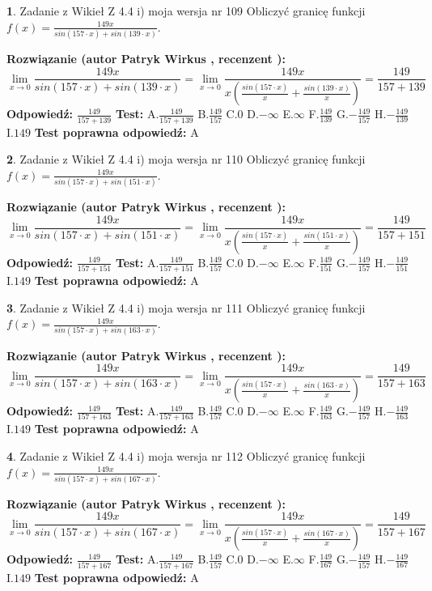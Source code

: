 \documentclass[12pt, a4paper]{article}
\theoremstyle{definition} %
\newtheorem{zad}{}
\newcommand{\zadStart}[1]{\begin{zad}#1\newline}
\newcommand{\zadStop}{\end{zad}}
\newcommand{\rozwStart}[2]{\noindent \textbf{Rozwiązanie (autor #1 , recenzent #2): }\newline}
\newcommand{\rozwStop}{\newline}
\newcommand{\odpStart}{\noindent \textbf{Odpowiedź:}\newline}
\newcommand{\odpStop}{\newline}
\newcommand{\testStart}{\noindent \textbf{Test:}\newline}
\newcommand{\testStop}{\newline}
\newcommand{\kluczStart}{\noindent \textbf{Test poprawna odpowiedź:}\newline}
\newcommand{\kluczStop}{\newline}
\begin{document}
\zadStart{Zadanie z Wikieł Z 4.4 i) moja wersja nr 109}
Obliczyć granicę funkcji $f(x)=\frac{149x}{sin(157\cdot x) +sin(139\cdot x)}$.
\zadStop
\rozwStart{Patryk Wirkus}{}
$$\lim\limits_{x\to 0}\frac{149x}{sin(157\cdot x) +sin(139\cdot x)}=\lim\limits_{x\to 0}\frac{149x}{x(\frac{sin(157\cdot x)}{x}+\frac{sin(139\cdot x)}{x})}=\frac{149}{157+139}$$
\rozwStop
\odpStart
$\frac{149}{157+139}$
\odpStop
\testStart
A.$\frac{149}{157+139}$
B.$\frac{149}{157}$
C.$0$
D.$-\infty$
E.$\infty$
F.$\frac{149}{139}$
G.$-\frac{149}{157}$
H.$-\frac{149}{139}$
I.$149$
\testStop
\kluczStart
A
\kluczStop



\zadStart{Zadanie z Wikieł Z 4.4 i) moja wersja nr 110}
Obliczyć granicę funkcji $f(x)=\frac{149x}{sin(157\cdot x) +sin(151\cdot x)}$.
\zadStop
\rozwStart{Patryk Wirkus}{}
$$\lim\limits_{x\to 0}\frac{149x}{sin(157\cdot x) +sin(151\cdot x)}=\lim\limits_{x\to 0}\frac{149x}{x(\frac{sin(157\cdot x)}{x}+\frac{sin(151\cdot x)}{x})}=\frac{149}{157+151}$$
\rozwStop
\odpStart
$\frac{149}{157+151}$
\odpStop
\testStart
A.$\frac{149}{157+151}$
B.$\frac{149}{157}$
C.$0$
D.$-\infty$
E.$\infty$
F.$\frac{149}{151}$
G.$-\frac{149}{157}$
H.$-\frac{149}{151}$
I.$149$
\testStop
\kluczStart
A
\kluczStop



\zadStart{Zadanie z Wikieł Z 4.4 i) moja wersja nr 111}
Obliczyć granicę funkcji $f(x)=\frac{149x}{sin(157\cdot x) +sin(163\cdot x)}$.
\zadStop
\rozwStart{Patryk Wirkus}{}
$$\lim\limits_{x\to 0}\frac{149x}{sin(157\cdot x) +sin(163\cdot x)}=\lim\limits_{x\to 0}\frac{149x}{x(\frac{sin(157\cdot x)}{x}+\frac{sin(163\cdot x)}{x})}=\frac{149}{157+163}$$
\rozwStop
\odpStart
$\frac{149}{157+163}$
\odpStop
\testStart
A.$\frac{149}{157+163}$
B.$\frac{149}{157}$
C.$0$
D.$-\infty$
E.$\infty$
F.$\frac{149}{163}$
G.$-\frac{149}{157}$
H.$-\frac{149}{163}$
I.$149$
\testStop
\kluczStart
A
\kluczStop



\zadStart{Zadanie z Wikieł Z 4.4 i) moja wersja nr 112}
Obliczyć granicę funkcji $f(x)=\frac{149x}{sin(157\cdot x) +sin(167\cdot x)}$.
\zadStop
\rozwStart{Patryk Wirkus}{}
$$\lim\limits_{x\to 0}\frac{149x}{sin(157\cdot x) +sin(167\cdot x)}=\lim\limits_{x\to 0}\frac{149x}{x(\frac{sin(157\cdot x)}{x}+\frac{sin(167\cdot x)}{x})}=\frac{149}{157+167}$$
\rozwStop
\odpStart
$\frac{149}{157+167}$
\odpStop
\testStart
A.$\frac{149}{157+167}$
B.$\frac{149}{157}$
C.$0$
D.$-\infty$
E.$\infty$
F.$\frac{149}{167}$
G.$-\frac{149}{157}$
H.$-\frac{149}{167}$
I.$149$
\testStop
\kluczStart
A
\kluczStop
\end{document}
